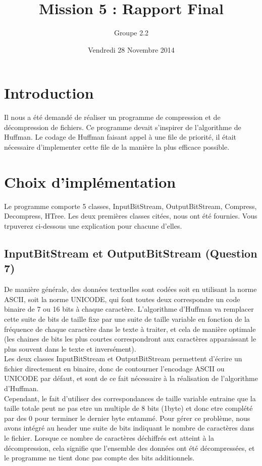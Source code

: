 \documentclass[10pt,a4paper]{article}
\date{Vendredi 28 Novembre 2014}
\author{Groupe 2.2}
\title{Mission 5 : Rapport Final}
\begin{document}
\maketitle
\section*{Introduction}
Il nous a été demandé de réaliser un programme de compression et de décompression de fichiers. Ce programme devait s'inspirer de l'algorithme de Huffman. Le codage de Huffman faisant appel à une file de priorité, il était nécessaire d'implementer cette file de la manière la plus efficace possible.

\section*{Choix d'implémentation}
Le programme comporte 5 classes, InputBitStream, OutputBitStream, Compress, Decompress, HTree. Les deux premières classes citées, nous ont été fournies. Vous trpuverez ci-dessous une explication pour chacune d'elles.

\subsection*{InputBitStream et OutputBitStream (Question 7)}
De manière générale, des données textuelles sont codées soit en utilisant la norme ASCII, soit la norme UNICODE, qui font toutes deux correspondre un code binaire de 7 ou 16 bits à chaque caractère. L'algorithme d'Huffman va remplacer cette suite de bits de taille fixe par une suite de taille variable en fonction de la fréquence de chaque caractère dans le texte à traiter, et cela de manière optimale (les chaines de bits les plus courtes correspondront aux caractères apparaissant le plus souvent dans le texte et inversément).\\

	Les deux classes InputBitStream et OutputBitStream permettent d'écrire un fichier directement en binaire, donc de contourner l'encodage ASCII ou UNICODE par défaut, et sont de ce fait nécessaire à la réalisation de l'algorithme d'Huffman.\\
	
	Cependant, le fait d'utiliser des correspondances de taille variable entraine que la taille totale peut ne pas etre un multiple de 8 bits (1byte) et donc etre complété par des 0 pour terminer le dernier byte entammé. Pour gérer ce problème, nous avons intégré au header une suite de bits indiquant le nombre de caractères dans le fichier. Lorsque ce nombre de caractères déchiffrés est atteint à la décompression, cela signifie que l'ensemble des données ont été décompressées, et le programme ne tient donc pas compte des bits additionnels.
\end{document}
